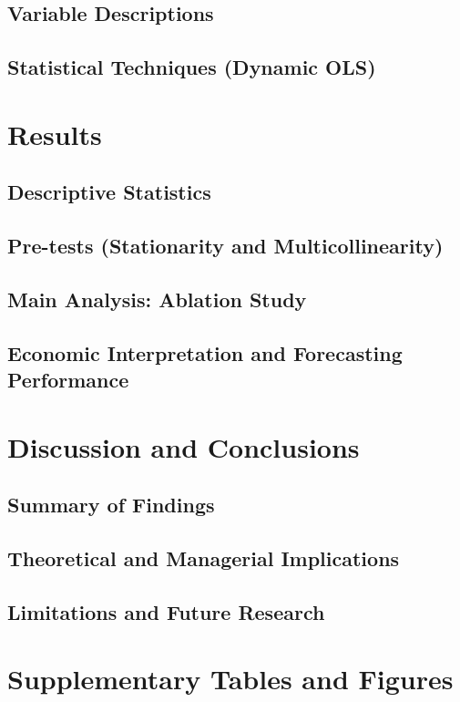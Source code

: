 \documentclass[stu, 12pt, a4paper]{apa7}
\begin{document}
\subsection{Variable Descriptions}
\subsection{Statistical Techniques (Dynamic OLS)}

\section{Results}
\subsection{Descriptive Statistics}
\subsection{Pre-tests (Stationarity and Multicollinearity)}
\subsection{Main Analysis: Ablation Study}
\subsection{Economic Interpretation and Forecasting Performance}

\section{Discussion and Conclusions}
\subsection{Summary of Findings}
\subsection{Theoretical and Managerial Implications}
\subsection{Limitations and Future Research}

\printbibliography

\appendix
\section{Supplementary Tables and Figures}
\end{document}
